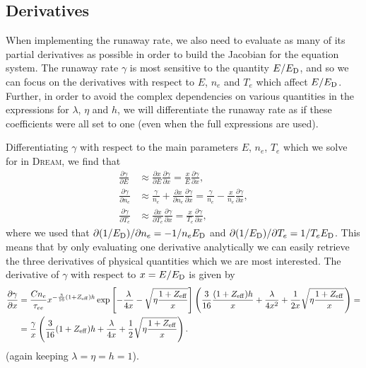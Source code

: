 \documentclass{notes}
\newcommand{\DREAM}{\textsc{Dream}}
\newcommand{\ED}{E_{\rm D}}
\newcommand{\Zeff}{Z_{\rm eff}}
\begin{document}
    \subsection*{Derivatives}
    When implementing the runaway rate, we also need to evaluate as many of its
    partial derivatives as possible in order to build the Jacobian for the
    equation system. The runaway rate $\gamma$ is most sensitive to the
    quantity $E/\ED$, and so we can focus on the derivatives with respect
    to $E$, $n_e$ and $T_e$ which affect $E/\ED$. Further, in order to avoid the
    complex dependencies on various quantities in the expressions for $\lambda$,
    $\eta$ and $h$, we will differentiate the runaway rate as if these
    coefficients were all set to one (even when the full expressions are used).

    Differentiating $\gamma$ with respect to the main parameters $E$, $n_e$,
    $T_e$ which we solve for in \DREAM, we find that
    \begin{equation}
        \begin{aligned}
            \frac{\partial\gamma}{\partial E} &\approx
                \frac{\partial x}{\partial E}\frac{\partial\gamma}{\partial x} =
                \frac{x}{E}\frac{\partial\gamma}{\partial x},\\
            \frac{\partial\gamma}{\partial n_e} &\approx \frac{\gamma}{n_e} +
                \frac{\partial x}{\partial n_e}\frac{\partial\gamma}{\partial x} =
                \frac{\gamma}{n_e} - \frac{x}{n_e}\frac{\partial\gamma}{\partial x},\\
            \frac{\partial\gamma}{\partial T_e} &\approx
                \frac{\partial x}{\partial T_e}\frac{\partial\gamma}{\partial x} =
                \frac{x}{T_e}\frac{\partial\gamma}{\partial x},
        \end{aligned}
    \end{equation}
    where we used that $\partial(1/\ED)/\partial n_e = -1/n_e\ED$ and
    $\partial(1/\ED)/\partial T_e = 1/T_e\ED$. This means that by only
    evaluating one derivative analytically we can easily retrieve the three
    derivatives of physical quantities which we are most interested. The
    derivative of $\gamma$ with respect to $x=E/\ED$ is given by
    \begin{equation}
        \begin{aligned}
            \frac{\partial\gamma}{\partial x} &=
                \frac{Cn_e}{\tau_{ee}}x^{-\frac{3}{16}(1+\Zeff)h}
                \exp\left[ -\frac{\lambda}{4x} - \sqrt{\eta\frac{1+\Zeff}{x}} \right]
                \left( \frac{3}{16}\frac{(1+\Zeff)h}{x} + \frac{\lambda}{4x^2} +
                \frac{1}{2x}\sqrt{\eta\frac{1+\Zeff}{x}}\right) =\\
            &= \frac{\gamma}{x}\left(
                \frac{3}{16}(1+\Zeff)h + \frac{\lambda}{4x} +
                \frac{1}{2}\sqrt{\eta\frac{1+\Zeff}{x}}
            \right).
        \end{aligned}
    \end{equation}
    (again keeping $\lambda=\eta=h=1$).
\end{document}
